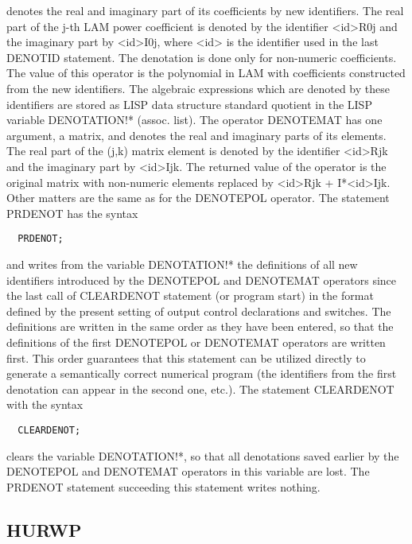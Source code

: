 denotes  the  real  and  imaginary  part  of  its  coefficients  by  new
identifiers. The  real part of the j-th LAM power coefficient is denoted
by the identifier <id>R0j and the imaginary part by <id>I0j,  where <id>
is the  identifier used in the last DENOTID statement. The denotation is
done only for non-numeric  coefficients. The  value of  this operator is
the  polynomial  in  LAM  with  coefficients  constructed  from  the new
identifiers.  The  algebraic  expressions  which  are  denoted  by these
identifiers are  stored as  LISP data structure standard quotient in the
LISP variable DENOTATION!* (assoc. list).
     The operator DENOTEMAT has one argument, a matrix,  and denotes the
real and  imaginary parts  of its  elements. The  real part of the (j,k)
matrix element is denoted  by the  identifier <id>Rjk  and the imaginary
part  by  <id>Ijk.  The  returned  value of the operator is the original
matrix with non-numeric elements replaced by <id>Rjk +  I*<id>Ijk. Other
matters are the same as for the DENOTEPOL operator.
     The statement PRDENOT has the syntax
\begin{verbatim}
  PRDENOT;
\end{verbatim}
and writes  from the  variable DENOTATION!*  the definitions  of all new
identifiers introduced  by the  DENOTEPOL and  DENOTEMAT operators since
the last  call of  CLEARDENOT statement (or program start) in the format
defined by  the  present  setting  of  output  control  declarations and
switches. The  definitions are  written   in the same order as they have
been  entered,  so  that  the  definitions  of  the  first  DENOTEPOL or
DENOTEMAT operators  are written  first. This order guarantees that this
statement can be utilized  directly to  generate a  semantically correct
numerical program  (the identifiers from the first denotation can appear
in the second one, etc.).
     The statement CLEARDENOT with the syntax
\begin{verbatim}
  CLEARDENOT;
\end{verbatim}
clears the variable DENOTATION!*, so that all denotations  saved earlier
by the  DENOTEPOL and DENOTEMAT operators in this variable are lost. The
PRDENOT statement succeeding this statement writes nothing.




\subsection{HURWP}




